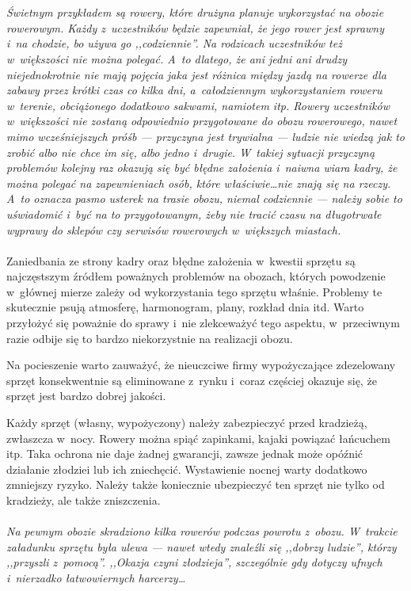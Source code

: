 \documentclass[a5paper,10pt,titlepage,twoside]{article}
\begin{document}
\\
\\
\small{
\emph{Świetnym przykładem są rowery, które drużyna planuje wykorzystać na obozie rowerowym. Każdy z~uczestników będzie zapewniał, że jego rower jest sprawny i~na chodzie, bo używa go ,,codziennie''. Na rodzicach uczestników też w~większości nie można polegać. A~to dlatego, że ani jedni ani drudzy niejednokrotnie nie mają pojęcia jaka jest różnica między jazdą na rowerze dla zabawy przez krótki czas co kilka dni, a~całodziennym wykorzystaniem roweru w~terenie, obciążonego dodatkowo sakwami, namiotem itp. Rowery uczestników w~większości nie zostaną odpowiednio przygotowane do obozu rowerowego, nawet mimo wcześniejszych próśb --- przyczyna jest trywialna --- ludzie nie wiedzą jak to zrobić albo nie chce im się, albo jedno i~drugie. W~takiej sytuacji przyczyną problemów kolejny raz okazują się być błędne założenia i~naiwna wiara kadry, że można polegać na zapewnieniach osób, które właściwie\ldots nie znają się na rzeczy. A~to oznacza pasmo usterek na trasie obozu, niemal codziennie --- należy sobie to uświadomić i~być na to przygotowanym, żeby nie tracić czasu na długotrwałe wyprawy do sklepów czy serwisów rowerowych w~większych miastach.}}
\\
\\
Zaniedbania ze strony kadry oraz błędne założenia w~kwestii sprzętu są najczęstszym źródłem poważnych problemów na obozach, których powodzenie w~głównej mierze zależy od wykorzystania tego sprzętu właśnie. Problemy te skutecznie psują atmosferę, harmonogram, plany, rozkład dnia itd. Warto przyłożyć się poważnie do sprawy i~nie zlekceważyć tego aspektu, w~przeciwnym razie odbije się to bardzo niekorzystnie na realizacji obozu.

Na pocieszenie warto zauważyć, że nieuczciwe firmy wypożyczające zdezelowany sprzęt konsekwentnie są eliminowane z~rynku i~coraz częściej okazuje się, że sprzęt jest bardzo dobrej jakości.

Każdy sprzęt  (własny, wypożyczony) należy zabezpieczyć przed kradzieżą, zwłaszcza w~nocy. Rowery można spiąć zapinkami, kajaki powiązać łańcuchem itp. Taka ochrona nie daje żadnej gwarancji, zawsze jednak może opóźnić działanie złodziei lub ich zniechęcić. Wystawienie nocnej warty dodatkowo zmniejszy ryzyko. Należy także koniecznie ubezpieczyć ten sprzęt nie tylko od kradzieży, ale także zniszczenia.
\\
\\
\small{
\emph{Na pewnym obozie skradziono kilka rowerów podczas powrotu z~obozu. W~trakcie załadunku sprzętu była ulewa --- nawet wtedy znaleźli się ,,dobrzy ludzie'', którzy ,,przyszli z~pomocą''. ,,Okazja czyni złodzieja'', szczególnie gdy dotyczy ufnych i~nierzadko łatwowiernych harcerzy\ldots}}
\end{document}
